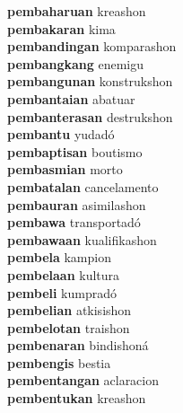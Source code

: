 \textbf{pembaharuan } kreashon \\
\textbf{pembakaran } kima \\
\textbf{pembandingan } komparashon \\
\textbf{pembangkang } enemigu \\
\textbf{pembangunan } konstrukshon \\
\textbf{pembantaian } abatuar \\
\textbf{pembanterasan } destrukshon \\
\textbf{pembantu } yudadó \\
\textbf{pembaptisan } boutismo \\
\textbf{pembasmian } morto \\
\textbf{pembatalan } cancelamento \\
\textbf{pembauran } asimilashon \\
\textbf{pembawa } transportadó \\
\textbf{pembawaan } kualifikashon \\
\textbf{pembela } kampion \\
\textbf{pembelaan } kultura \\
\textbf{pembeli } kumpradó \\
\textbf{pembelian } atkisishon \\
\textbf{pembelotan } traishon \\
\textbf{pembenaran } bindishoná \\
\textbf{pembengis } bestia \\
\textbf{pembentangan } aclaracion \\
\textbf{pembentukan } kreashon \\
